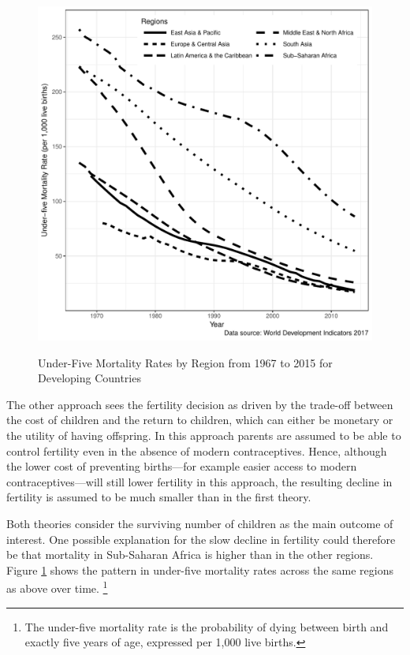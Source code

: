 \documentclass[letterpaper,12pt]{article}
\begin{document}
\begin{figure}[hp!]
    \centering
    \caption{Under-Five Mortality Rates by Region from 1967 to 2015 for Developing Countries}
    \includegraphics[width=0.95\linewidth]{../figures/childMortalityRatesBW.pdf}
    \label{fig:mortality}
\end{figure}

The other approach sees the fertility decision as driven by the
trade-off between the cost of children and the return to children, which
can either be monetary or the utility of having offspring. 
In this approach parents are assumed to be able to control fertility
even in the absence of modern contraceptives. 
Hence, although the lower cost of preventing births---for example easier
access to modern contraceptives---will still lower fertility in this
approach, the resulting decline in fertility is assumed to be much
smaller than in the first theory.

Both theories consider the surviving number of children as the main
outcome of interest. 
One possible explanation for the slow decline in fertility could
therefore be that mortality in Sub-Saharan Africa is higher than in the
other regions. 
Figure \ref{fig:mortality} shows the pattern in under-five mortality
rates across the same regions as above over time.%
\footnote{
The under-five mortality rate is the probability of dying between birth
and exactly five years of age, expressed per 1,000 live births.}
\end{document}
